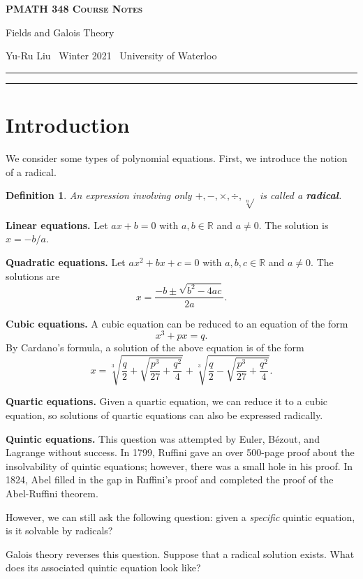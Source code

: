 \documentclass[10pt]{article}
\newcommand{\R}{\mathbb{R}}
\newcommand{\newtitle}[4]{
  \begin{center}
	\huge{\textbf{\textsc{#1 Course Notes}}}
    
	\large{\sc #2}
    
	{\sc #3 \textbullet\, #4 \textbullet\, University of Waterloo}
	\normalsize\vspace{1cm}\hrule
  \end{center}
}
\theoremstyle{newstyle}
\newtheorem{defn}[thm]{Definition}
\begin{document}
\pagestyle{fancy}
\newtitle{PMATH 348}{Fields and Galois Theory}{Yu-Ru Liu}{Winter 2021}

\tableofcontents
\vspace{1cm}\hrule
\fancyhead[R]{\nouppercase\rightmark}
\newpage 
{}

\section{Introduction}

We consider some types of polynomial equations. First, we introduce the notion of a radical.

\begin{defn}
An expression involving only $+, -, \times, \div, \sqrt[n]{}$ is called a {\bf radical}.
\end{defn}

{\bf Linear equations.} Let $ax + b = 0$ with $a, b \in \R$ and $a \neq 0$. The solution is $x = -b/a$.

{\bf Quadratic equations.} Let $ax^2 + bx + c = 0$ with $a, b, c \in \R$ and $a \neq 0$. The solutions are 
\[ x = \frac{-b \pm \sqrt{b^2-4ac}}{2a}. \]

{\bf Cubic equations.} A cubic equation can be reduced to an equation of the form 
\[ x^3 + px = q. \]
By Cardano's formula, a solution of the above equation is of the form 
\[ x = \sqrt[3]{\frac{q}2 + \sqrt{\frac{p^3}{27} + \frac{q^2}4}} + 
\sqrt[3]{\frac{q}2 - \sqrt{\frac{p^3}{27} + \frac{q^2}4}}. \]

{\bf Quartic equations.} Given a quartic equation, we can reduce it to a cubic equation, so 
solutions of quartic equations can also be expressed radically. 

{\bf Quintic equations.} This question was attempted by Euler, B\'ezout, and Lagrange without success.
In 1799, Ruffini gave an over 500-page proof about the insolvability of quintic equations; 
however, there was a small hole in his proof. In 1824, Abel filled in the gap in Ruffini's proof 
and completed the proof of the Abel-Ruffini theorem.

However, we can still ask the following question: given a {\it specific} quintic equation, is it 
solvable by radicals? 

Galois theory reverses this question. Suppose that a radical solution exists. 
What does its associated quintic equation look like?
\end{document}
